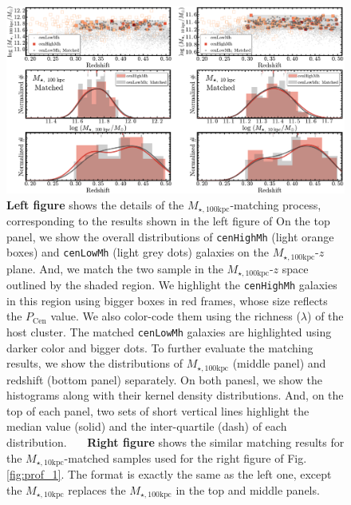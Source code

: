 \documentclass{emulateapj}
\def\rbcg{\texttt{cenHighMh}}
\def\nbcg{\texttt{cenLowMh}}
\def\minn{{$M_{\star,10\mathrm{kpc}}$}}
\def\mtot{{$M_{\star,100\mathrm{kpc}}$}}
\begin{document}
\begin{CJK*}{UTF8}{gbsn}
\begin{figure}[hbt!]
    \centering 
    \includegraphics[width=\textwidth]{fig/redbcg_match}
    \caption{\textbf{Left figure} shows the details of the \mtot{}-matching process, 
        corresponding to the results shown in the left figure of   
        On the top panel, we show the overall distributions of \rbcg{} (light orange boxes) 
        and \nbcg{} (light grey dots) galaxies on the \mtot{}-$z$ plane.  
        And, we match the two sample in the \mtot{}-$z$ space outlined by the shaded region.
        We highlight the \rbcg{} galaxies in this region using bigger boxes in red frames, 
        whose size reflects the $P_{\mathrm{Cen}}$ value.  
        We also color-code them using the richness ($\lambda$) of the host cluster. 
        The matched \nbcg{} galaxies are highlighted using darker color and bigger dots. 
        To further evaluate the matching results, we show the distributions of \mtot{} 
        (middle panel) and redshift (bottom panel) separately. 
        On both panesl, we show the histograms along with their kernel density 
        distributions.  
        And, on the top of each panel, two sets of short vertical lines highlight the median 
        value (solid) and the inter-quartile (dash) of each distribution.~~~
        \textbf{Right figure} shows the similar matching results for the \minn{}-matched
        samples used for the right figure of Fig.\ref{fig:prof_1}.
        The format is exactly the same as the left one, except the \minn{} replaces the 
        \mtot{} in the top and middle panels.}
    \label{fig:match}
\end{figure}
        

\end{CJK*}
\end{document}
